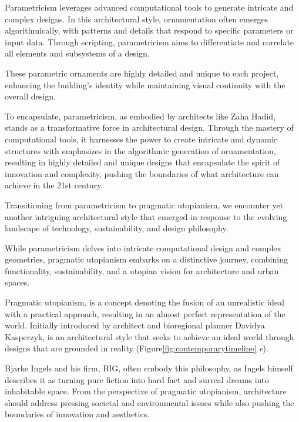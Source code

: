 Parametricism leverages advanced computational tools to generate intricate and complex designs.
In this architectural style, ornamentation often emerges algorithmically, with patterns and details that respond to specific parameters or input data.
Through scripting, parametricism aims to differentiate and correlate all elements and subsystems of a design\cite{Schumacher2010}.

These parametric ornaments are highly detailed and unique to each project, enhancing the building's identity while maintaining visual continuity with the overall design.

To encapsulate, parametricism, as embodied by architects like Zaha Hadid,  stands as a transformative force in architectural design.
Through the mastery of computational tools, it harnesses the power to create intricate and dynamic structures with emphasizes in the algorithmic generation of ornamentation, resulting in highly detailed and unique designs that encapsulate the spirit of innovation and complexity, pushing the boundaries of what architecture can achieve in the 21st century.


Transitioning from parametricism to pragmatic utopianism, we encounter yet another intriguing architectural style that emerged in response to the evolving landscape of technology, sustainability, and design philosophy.

While parametricism delves into intricate computational design and complex geometries, pragmatic utopianism embarks on a distinctive journey, combining functionality, sustainability, and a utopian vision for architecture and urban spaces.

Pragmatic utopianism, is a concept denoting the fusion of an unrealistic ideal with a practical approach, resulting in an almost perfect representation of the world.
Initially introduced by architect and bioregional planner Davidya Kasperzyk\cite{Stouhi2022}, is an architectural style that seeks to achieve an ideal world through designs that are grounded in reality (Figure\ref{fig:contemporarytimeline} \textit{e}).

Bjarke Ingels and his firm, BIG, often embody this philosophy, as Ingels himself describes it as turning pure fiction into hard fact and surreal dreams into inhabitable space\cite{Ingels2015}.
From the perspective of pragmatic utopianism, architecture should address pressing societal and environmental issues while also pushing the boundaries of innovation and aesthetics.

